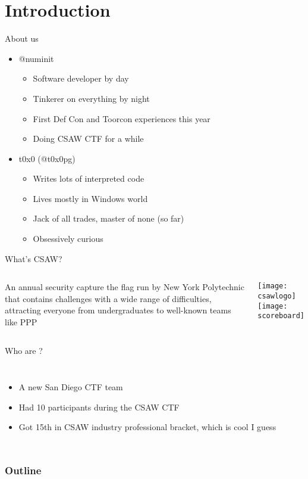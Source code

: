 
\section{Introduction}

\begin{frame}{About us}
    \begin{itemize}
        \item @numinit
        \begin{itemize}
            \item Software developer by day
            \item Tinkerer on everything by night
            \item First Def Con and Toorcon experiences this year
            \item Doing CSAW CTF for a while
        \end{itemize}
        \item t0x0 (@t0x0pg)
        \begin{itemize}
            \item Writes lots of interpreted code
            \item Lives mostly in Windows world
            \item Jack of all trades, master of none (so far)
            \item Obsessively curious
        \end{itemize}
    \end{itemize}
\end{frame}

\begin{frame}{What's CSAW?}
    \begin{columns}
        An annual security capture the flag run by New York Polytechnic that
        contains challenges with a \alert{wide range of difficulties},
        attracting everyone from undergraduates to well-known teams like PPP

        \texttt{[image: csawlogo]} \\
        \texttt{[image: scoreboard]}
    \end{columns}
\end{frame}

\begin{frame}{Who are \VaporSec?}
    \begin{columns}
        \begin{itemize}
            \item A new \Aesthetic San Diego CTF team
            \item Had 10 participants during the CSAW CTF
            \item Got 15th in CSAW industry professional bracket, which is
                  cool I guess
        \end{itemize}

    \end{columns}
\end{frame}

\begin{frame}
    \frametitle{Outline}
    \tableofcontents[]
\end{frame}
